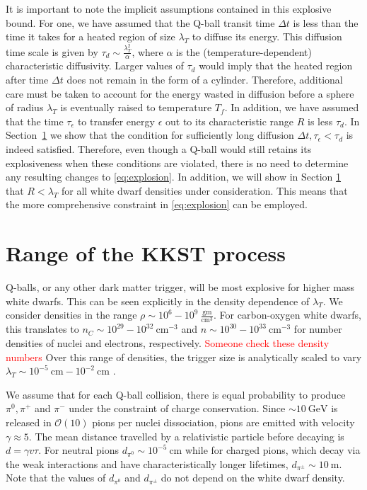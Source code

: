 \documentclass[11 pt, preprint,preprintnumbers,amsmath,amssymb, prd]{revtex4}
\newcommand{\OO}{\mathcal{O}}
\begin{document}
It is important to note the implicit assumptions contained in this explosive bound. For one, we have assumed that the Q-ball transit time $\Delta t$ is less than the time it takes for a heated region of size $\lambda_T$ to diffuse its energy. This diffusion time scale is given by $\tau_d \sim \frac{\lambda_T^2}{\alpha}$, where $\alpha$ is the (temperature-dependent) characteristic diffusivity. Larger values of $\tau_d$ would imply that the heated region after time $\Delta t$ does not remain in the form of a cylinder. Therefore, additional care must be taken to account for the energy wasted in diffusion before a sphere of radius $\lambda_T$ is eventually raised to temperature $T_f$. In addition, we have assumed that the time $\tau_\epsilon$ to transfer energy $\epsilon$ out to its characteristic range $R$ is less $\tau_d$. In Section~\ref{sec:pionrange} we show that the condition for sufficiently long diffusion $\Delta t, \tau_\epsilon < \tau_d$ is indeed satisfied. Therefore, even though a Q-ball would still retains its explosiveness when these conditions are violated, there is no need to determine any resulting changes to \ref{eq:explosion}. In addition, we will show in Section \ref{sec:pionrange} that $R < \lambda_T$ for all white dwarf densities under consideration. This means that the more comprehensive constraint in \ref{eq:explosion} can be employed. 

\section{Range of the KKST process}
\label{sec:pionrange}

Q-balls, or any other dark matter trigger, will be most explosive for higher mass white dwarfs. This can be seen explicitly in the density dependence of $\lambda_T$. We consider densities in the range $\rho \sim 10^{6} - 10^{9} ~\frac{\text{gm}}{\text{cm}^3}$. For carbon-oxygen white dwarfs, this translates to $n_C \sim 10^{29} - 10^{32} ~\text{cm}^{-3}$ and $n \sim 10^{30} - 10^{33} ~\text{cm}^{-3}$ for number densities of nuclei and electrons, respectively. \textcolor{red}{Someone check these density numbers} Over this range of densities, the trigger size is analytically scaled to vary $\lambda_T \sim 10^{-5} ~\text{cm} -10^{-2} ~\text{cm}$ \cite{Varela}. 

We assume that for each Q-ball collision, there is equal probability to produce $\pi^0, \pi^+$ and $\pi^-$ under the constraint of charge conservation. Since $\sim 10 ~\text{GeV}$ is released in $\OO(10)$ pions per nuclei dissociation, pions are emitted with velocity $\gamma \approx 5$. The mean distance travelled by a relativistic particle before decaying is $d = \gamma v \tau$. For neutral pions $d_{\pi^0} \sim 10^{-5} ~\text{cm}$ while for charged pions, which decay via the weak interactions and have characteristically longer lifetimes, $d_{\pi^\pm} \sim 10 ~\text{m}$. Note that the values of $d_{\pi^0}$ and $d_{\pi^\pm}$ do not depend on the white dwarf density. 
\end{document}
